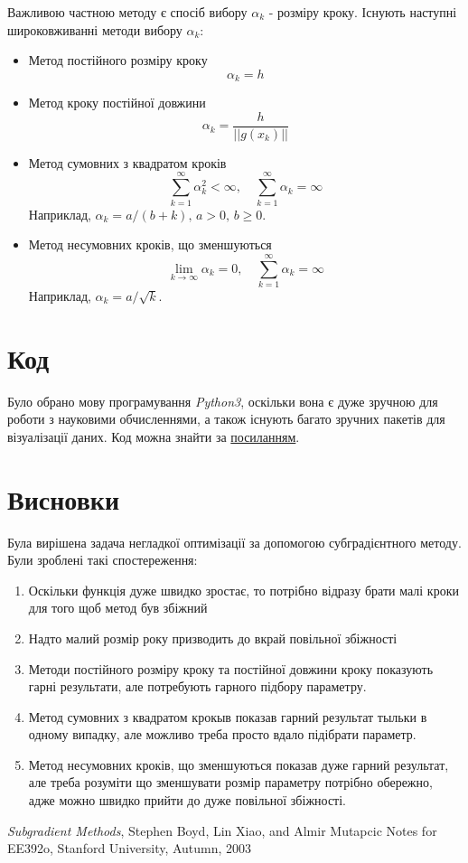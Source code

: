 \documentclass[a4paper, 14pt]{extarticle}
\begin{document}
Важливою частною методу є спосіб вибору $\alpha_k$ - розміру кроку.
Існують наступні широковживанні методи вибору $\alpha_k$:
\begin{itemize}
    \item Метод постійного розміру кроку
    \[
    \alpha_k = h    
    \]
    \item Метод кроку постійної довжини
    \[
    \alpha_k = \frac{h}{||g(x_k)||}    
    \]
    \item Метод сумовних з квадратом кроків
    \[
    \sum_{k=1}^\infty \alpha_k^2 <\infty, \quad 
    \sum_{k=1}^\infty \alpha_k = \infty
    \]
    Наприклад, $\alpha_k = a/(b+k), \, a>0,\,b\geq0$.
    \item Метод несумовних кроків, що зменшуються
    \[
        \lim_{k\to\infty}\alpha_k = 0,
        \quad\sum_{k=1}^\infty \alpha_k = \infty  
    \]
    Наприклад, $\alpha_k = a/\sqrt{k}$.
\end{itemize}
\section{Код}
Було обрано мову програмування \emph{Python3}, оскільки 
вона є дуже зручною для роботи з науковими обчисленнями,
а також існують багато зручних пакетів для візуалізації даних.
Код можна знайти за \href{http://www.example.com}{посиланням}.
\section{Висновки}
Була вирішена задача негладкої оптимізації за допомогою субградієнтного
методу. Були зроблені такі спостереження:
\begin{enumerate}
    \item Оскільки функція дуже швидко зростає, то 
    потрібно відразу брати малі кроки для того щоб метод був збіжний
    \item Надто малий розмір року призводить до вкрай повільної збіжності
    \item Методи постійного розміру кроку та 
    постійної довжини кроку показують гарні результати, але потребують 
    гарного підбору параметру.
    \item Метод сумовних з квадратом крокыв показав гарний результат 
    тыльки в одному випадку, але можливо треба просто вдало підібрати параметр.
    \item Метод несумовних кроків, що зменшуються показав 
    дуже гарний результат, але треба розуміти що зменшувати розмір 
    параметру потрібно обережно, адже можно швидко 
    прийти до дуже повільної збіжності. 
\end{enumerate}
\newpage
\begin{thebibliography}{1}
\emph{Subgradient Methods},
Stephen Boyd, Lin Xiao, and Almir Mutapcic
Notes for EE392o, Stanford University, Autumn, 2003
\end{thebibliography}
\newpage
\end{document}
